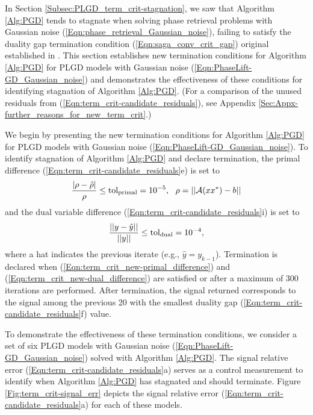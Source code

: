 In Section \ref{Subsec:PLGD_term_crit-stagnation}, we saw that Algorithm \ref{Alg:PGD} tends to stagnate when solving phase retrieval problems with Gaussian noise (\ref{Eqn:phase_retrieval_Gaussian_noise}), failing to satisfy the duality gap termination condition (\ref{Eqn:saga_conv_crit_gap}) original established in \cite{DBLP:journals/siamsc/FriedlanderM16}.  
This section establishes new termination conditions for Algorithm \ref{Alg:PGD} for PLGD models with Gaussian noise (\ref{Eqn:PhaseLift-GD_Gaussian_noise}) and demonstrates the effectiveness of these conditions for identifying stagnation of Algorithm \ref{Alg:PGD}.  
(For a comparison of the unused residuals from (\ref{Eqn:term_crit-candidate_residuals}), see Appendix \ref{Sec:Appx-further_reasons_for_new_term_crit}.)







We begin by presenting the new termination conditions for Algorithm \ref{Alg:PGD} for PLGD models with Gaussian noise (\ref{Eqn:PhaseLift-GD_Gaussian_noise}).  To identify stagnation of Algorithm \ref{Alg:PGD} and declare termination, the primal difference (\ref{Eqn:term_crit-candidate_residuals}e) is set to 
\begin{equation}
	\label{Eqn:term_crit_new-primal_difference}
\frac{| \rho - \hat{\rho} |}{\rho} \leq  \textnormal{tol}_\textnormal{primal} = 10^{-5}, \ \ \rho = ||{\mathcal A}(xx^*) - b||
\end{equation}
and the dual variable difference (\ref{Eqn:term_crit-candidate_residuals}i) is set to
\begin{equation}
	\label{Eqn:term_crit_new-dual_difference}
\frac{||y- \hat{y}||}{||y||} \leq \textnormal{tol}_\textnormal{dual}= 10^{-4},
\end{equation}
where a hat indicates the previous iterate (e.g., $\hat{y} = y_{k-1}$).  Termination is declared when (\ref{Eqn:term_crit_new-primal_difference}) and (\ref{Eqn:term_crit_new-dual_difference}) are satisfied or after a maximum of 300 iterations are performed.  After termination, the signal returned corresponds to the signal among the previous 20 with the smallest duality gap (\ref{Eqn:term_crit-candidate_residuals}f) value.  










To demonstrate the effectiveness of these termination conditions, we consider a set of six PLGD models with Gaussian noise (\ref{Eqn:PhaseLift-GD_Gaussian_noise}) solved with Algorithm \ref{Alg:PGD}.   The signal relative error (\ref{Eqn:term_crit-candidate_residuals}a) serves as a control measurement to identify when Algorithm \ref{Alg:PGD} has stagnated and should terminate.  Figure \ref{Fig:term_crit-signal_err} depicts the signal relative error (\ref{Eqn:term_crit-candidate_residuals}a) for each of these models.


